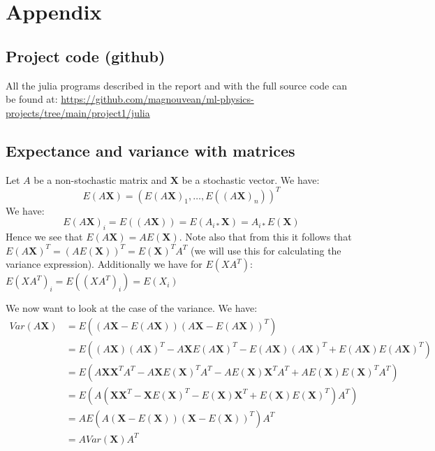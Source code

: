 \documentclass{article}
\begin{document}
\section{Appendix}

\subsection{Project code (github)}
All the julia programs described in the report and with the full source code can be
found at:
\url{https://github.com/magnouvean/ml-physics-projects/tree/main/project1/julia}

\subsection{Expectance and variance with matrices}
Let $A$ be a non-stochastic matrix and $\mathbf{X}$ be a stochastic vector. We have:
$$E(A \mathbf{X}) = (E(A \mathbf{X})_1, \dots, E((A \mathbf{X})_n))^T$$
We have:
$$E(A \mathbf{X})_i = E((A \mathbf{X})) = E(A_{i *} \mathbf{X}) = A_{i *} E(\mathbf{X})$$
Hence we see that $E(A \mathbf{X}) = A E(\mathbf{X})$.
Note also that from this it follows that $E(A \mathbf{X})^T = (A
    E(\mathbf{X}))^T = E(\mathbf{X})^T A^T$ (we will use this for calculating the
variance expression).
Additionally we have for $E(X A^T)$:
$E(X A^T)_i = E((X A^T)_i) = E(X_i )$

We now want to look at the case of the variance. We have:
\begin{align*}
    Var(A \mathbf{X}) & = E((A \mathbf{X} - E(A \mathbf{X})) (A \mathbf{X} - E(A \mathbf{X}))^T)                                                                       \\
                      & = E((A \mathbf{X})(A \mathbf{X})^T  - A \mathbf{X} E(A \mathbf{X})^T - E(A \mathbf{X}) (A \mathbf{X})^T + E(A \mathbf{X}) E(A \mathbf{X})^T)   \\
                      & = E(A \mathbf{X}\mathbf{X}^T A^T  - A \mathbf{X} E(\mathbf{X})^T A^T - A E(\mathbf{X}) \mathbf{X}^T A^T + A E(\mathbf{X}) E(\mathbf{X})^T A^T) \\
                      & = E(A (\mathbf{X}\mathbf{X}^T  - \mathbf{X} E(\mathbf{X})^T - E(\mathbf{X}) \mathbf{X}^T + E(\mathbf{X}) E(\mathbf{X})^T ) A^T)                \\
                      & = A E(A (\mathbf{X} - E(\mathbf{X})) (\mathbf{X} - E(\mathbf{X}))^T) A^T                                                                       \\
                      & = A Var(\mathbf{X}) A^T                                                                                                                        \\
\end{align*}



\end{document}
